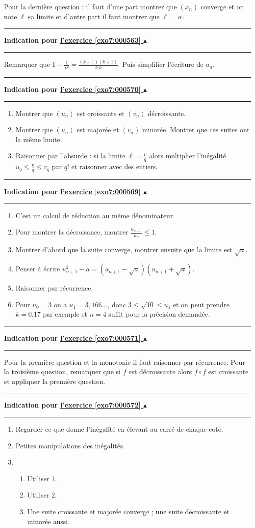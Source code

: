 \documentclass[11pt,a4paper]{article}
\newcommand{\noindication}{}
\newcounter{exo}
\newcommand{\indication}[1]{\hypertarget{ind7:#1}{}\label{ind7:#1}{\bf Indication pour \hyperlink{exo7:#1}{l'exercice \ref{exo7:#1} $\blacktriangle$}}\vspace{1mm}\hrule\vspace{1mm}}
\newcommand{\finindication}{\vspace{1mm}\hrule\vspace*{7mm}}
\begin{document}
Pour la derni\`ere question : il faut d'une part montrer que $(x_n)$ converge et on note $\ell$ sa limite
et d'autre part il faut montrer que $\ell = \alpha$.
\finindication
\indication{000563}
Remarquer que $1-\frac{1}{k^2} = \frac{(k-1)(k+1)}{k.k}$.
Puis simplifier l'\'ecriture de $u_n$.
\finindication
\noindication
\indication{000570}
\begin{enumerate}
  \item Montrer que $(u_n)$ est croissante et $(v_n)$ d\'ecroissante.
  \item Montrer que $(u_n)$ est major\'ee et $(v_n)$ minor\'ee. Montrer que ces suites ont la m\^eme limite.
  \item Raisonner par l'absurde : si la limite $\ell = \frac pq$
alors multiplier l'in\'egalit\'e $u_q \leq \frac pq \leq v_q$  par $q!$ et raisonner avec des entiers.
\end{enumerate}
\finindication
\indication{000569}
\begin{enumerate}
\item C'est un calcul de r\'eduction au m\^eme d\'enominateur.
\item Pour montrer la d\'ecroisance, montrer $\frac{u_{n+1}}{ u_n} \leqslant 1$.
\item Montrer d'abord que la suite converge, montrer ensuite que la limite est $\sqrt a$.
\item Penser \`a \'ecrire $u_{n+1}^2-a = (u_{n+1}-\sqrt a)(u_{n+1}+\sqrt a)$.
\item Raisonner par r\'ecurrence.
\item Pour $u_0= 3$ on a $u_1=3,166\ldots$, donc $3\leqslant \sqrt{10} \leqslant u_1$
et on peut prendre $k=0.17$ par exemple et $n=4$ suffit pour la pr\'ecision demand\'ee.
\end{enumerate}
\finindication
\indication{000571}
Pour la premi\`ere question et la monotonie il faut raisonner par r\'ecurrence.
Pour la troisi\`eme question, remarquer que si $f$ est d\'ecroissante alors $f\circ f$ est croissante
et appliquer la premi\`ere question.
\finindication
\indication{000572}
\begin{enumerate}
  \item Regarder ce que donne l'inégalité en élevant au carré de chaque coté.
  \item Petites manipulations des inégalités.
  \item 
  \begin{enumerate}
     \item Utiliser 1.
     \item Utiliser 2.
     \item Une suite croissante et majorée converge ; une suite décroissante et minorée aussi.
  \end{enumerate}
\end{enumerate}
\end{document}
